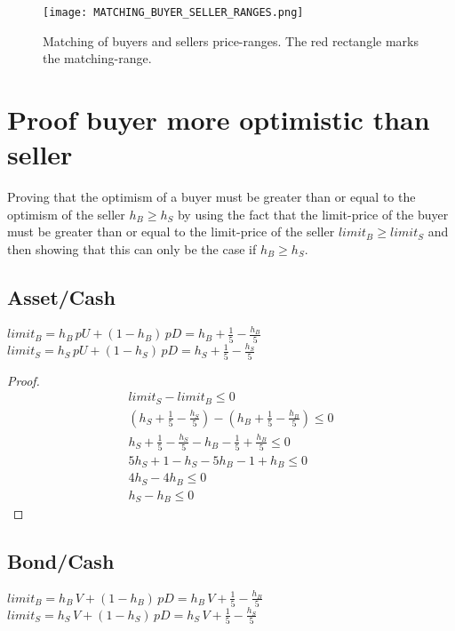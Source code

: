 \documentclass[Bachelorarbeit.tex]{subfiles}
\begin{document}
\begin{figure}[H]
	\centering
  \texttt{[image: MATCHING\_BUYER\_SELLER\_RANGES.png]}
  	\caption{Matching of buyers and sellers price-ranges. The red rectangle marks the matching-range.}
	\label{fig:MATCHING_BUYER_SELLER_RANGES}
\end{figure}

\section{Proof buyer more optimistic than seller}
Proving that the optimism of a buyer must be greater than or equal to the optimism of the seller $h_B \geq h_S$ by using the fact that the limit-price of the buyer must be greater than or equal to the limit-price of the seller $limit_B \geq limit_S$ and then showing that this can only be the case if $h_B \geq h_S$.

\subsection{Asset/Cash}
$limit_B = h_B \, pU + (1-h_B) \, pD = h_B + \frac{1}{5} - \frac{h_B}{5}$ \\
$limit_S = h_S \, pU + (1-h_S) \, pD = h_S + \frac{1}{5} - \frac{h_S}{5}$

\begin{proof}
\begin{align*}
	limit_S - limit_B \leq 0
	\\ (h_S + \frac{1}{5} - \frac{h_S}{5}) - ( h_B + \frac{1}{5} - \frac{h_B}{5} ) \leq 0
	\\ h_S + \frac{1}{5} - \frac{h_S}{5} - h_B - \frac{1}{5} + \frac{h_B}{5} \leq 0
	\\ 5h_S + 1 - h_S - 5h_B - 1 + h_B \leq 0
	\\ 4h_S - 4h_B \leq 0
	\\ h_S - h_B \leq 0		\tag*{can only hold if $h_B \geq h_S$}
\end{align*}
\end{proof}

\subsection{Bond/Cash}
$limit_B = h_B \, V + (1-h_B) \, pD = h_B \, V + \frac{1}{5} - \frac{h_B}{5}$ \\
$limit_S = h_S \, V + (1-h_S) \, pD = h_S \, V + \frac{1}{5} - \frac{h_S}{5}$
\end{document}

